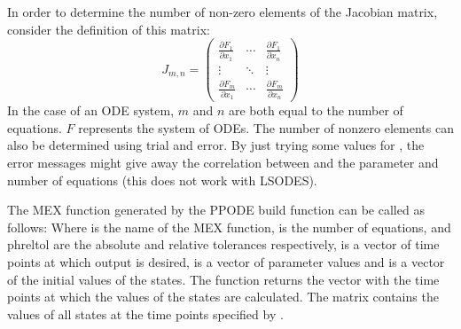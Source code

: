 In order to determine the number of non-zero elements of the Jacobian matrix, consider the definition of this matrix:
\begin{equation}
  J_{m,n} =
  \begin{pmatrix}
   \frac{\partial F_1}{\partial x_1} & \cdots & \frac{\partial F_1}{\partial x_n} \\
   \vdots & \ddots & \vdots  \\
   \frac{\partial F_m}{\partial x_1} & \cdots & \frac{\partial F_m}{\partial x_n}
  \end{pmatrix}
\end{equation}
In the case of an ODE system, $m$ and $n$ are both equal to the number of equations. $F$ represents the system of ODEs.
The number of nonzero elements can also be determined using trial and error. By just trying some values for , the error messages might give away the correlation between  and the parameter and number of equations (this does not work with LSODES).

The MEX function generated by the PPODE build function can be called as follows:
Where  is the name of the MEX function,  is the number of equations,  and ph{reltol} are the absolute and relative tolerances respectively,  is a vector of time points at which output is desired,  is a vector of parameter values and  is a vector of the initial values of the states. The function returns the vector  with the time points at which the values of the states are calculated. The matrix  contains the values of all states at the time points specified by .
